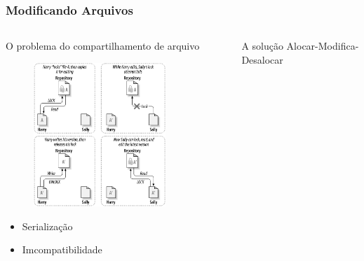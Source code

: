 \documentclass{beamer}
\begin{document}
\begin{frame}
    \frametitle{Modificando Arquivos}
        \begin{columns}
        \begin{column}{.5\textwidth}
            \begin{block}{O problema do compartilhamento de arquivo}
                \begin{figure}
                    \includegraphics[width=0.8\textwidth]{figures/lockmodifyunlock}
                \end{figure}
            \begin{itemize}
            \item Serializa\c{c}\~ao
            \item Imcompatibilidade
            \end{itemize}
            \end{block}
        \end{column}
        \begin{column}{.5\textwidth}
            \begin{block}{A solu\c{c}\~ao Alocar-Modifica-Desalocar}
                \begin{figure}

\end{figure}
\end{block}
\end{column}
\end{columns}
\end{frame}
\end{document}
